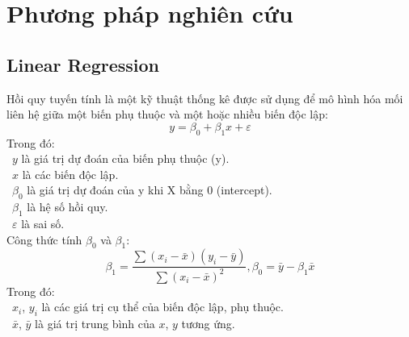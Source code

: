 \section{Phương pháp nghiên cứu}
\subsection{Linear Regression}
Hồi quy tuyến tính là một kỹ thuật thống kê được sử dụng để mô hình hóa mối liên hệ giữa một biến phụ thuộc và một hoặc nhiều biến độc lập:
\[y=\beta_0+\beta_1x+\varepsilon\]
Trong đó:\\
	\indent\textbullet\ \(y\) là giá trị dự đoán của biến phụ thuộc (y).\\
	\indent\textbullet\ \(x\) là các biến độc lập.\\
	\indent\textbullet\ \(\beta_0\) là giá trị dự đoán của y khi X bằng 0 (intercept).\\
	\indent\textbullet\ \(\beta_1\) là hệ số hồi quy.\\
	\indent\textbullet\ \(\varepsilon\) là sai số.
\\Công thức tính \(\beta_0\) và \(\beta_1\):\\
\[\beta_1=\frac{\sum\left(x_i-\bar{x}\right)\left(y_i-\bar{y}\right)}{\sum\left(x_i-\bar{x}\right)^2}, \beta_0=\bar{y}-\beta_1\bar{x}\]
Trong đó:\\
	\indent\textbullet\ \(x_i\), \(y_i\) là các giá trị cụ thể của biến độc lập, phụ thuộc.\\
	\indent\textbullet\ \(\bar{x}\), \(\bar{y}\) là giá trị trung bình của \(x\), \(y\) tương ứng.


